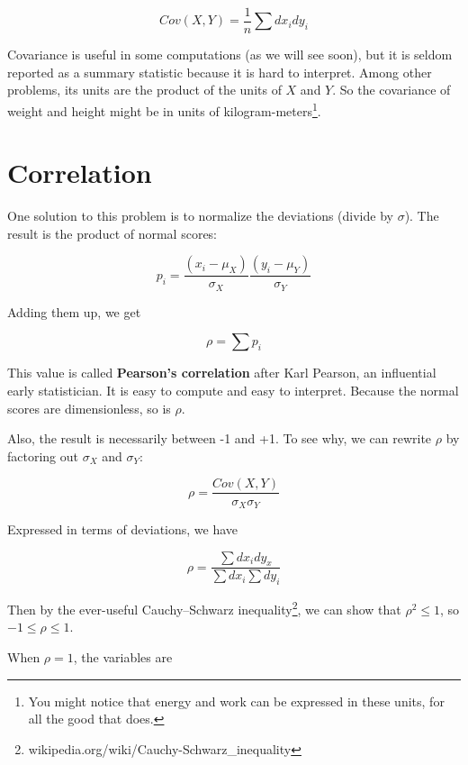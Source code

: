 \documentclass[12pt]{book}
\begin{document}
\[ Cov(X,Y) = \frac{1}{n} \sum dx_i dy_i \]

Covariance is useful in some computations (as we will see soon), but
it is seldom reported as a summary statistic because it is hard to
interpret.  Among other problems, its units are the product of the
units of $X$ and $Y$.  So the covariance of weight and height might be
in units of kilogram-meters\footnote{You might notice that energy and
  work can be expressed in these units, for all the good that
  does.}.


\section{Correlation}

One solution to this problem is to normalize the deviations (divide by
$\sigma$).  The result is the product of normal scores:

\[ p_i = \frac{(x_i - \mu_X)}{\sigma_X} \frac{(y_i - \mu_Y)}{\sigma_Y} \]

Adding them up, we get 

\[ \rho = \sum p_i \]

This value is called {\bf Pearson's correlation} after Karl Pearson,
an influential early statistician.  It is easy to compute and easy to
interpret.  Because the normal scores are dimensionless, so is $\rho$.

Also, the result is necessarily between -1 and +1.  To see why, we
can rewrite $\rho$ by factoring out $\sigma_X$ and $\sigma_Y$:

\[ \rho = \frac{Cov(X,Y)}{\sigma_X \sigma_Y} \]

Expressed in terms of deviations, we have

\[ \rho = \frac{\sum dx_i dy_x}{\sum dx_i \sum dy_i} \]

Then by the ever-useful Cauchy–Schwarz
inequality\footnote{wikipedia.org/wiki/Cauchy-Schwarz\_inequality}, we
can show that $\rho^2 \le 1$, so $-1 \le \rho \le 1$.

When $\rho=1$, the variables are 
\end{document}
